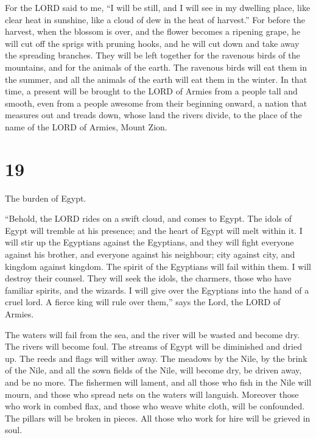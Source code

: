  For the LORD said to me, ``I will be still, and I will see
in my dwelling place, like clear heat in sunshine, like a cloud of dew
in the heat of harvest.''  For before the harvest, when the
blossom is over, and the flower becomes a ripening grape, he will cut
off the sprigs with pruning hooks, and he will cut down and take away
the spreading branches.  They will be left together for the
ravenous birds of the mountains, and for the animals of the earth. The
ravenous birds will eat them in the summer, and all the animals of the
earth will eat them in the winter.  In that time, a present
will be brought to the LORD of Armies from a people tall and smooth,
even from a people awesome from their beginning onward, a nation that
measures out and treads down, whose land the rivers divide, to the place
of the name of the LORD of Armies, Mount Zion.

\hypertarget{section-18}{%
\section{19}\label{section-18}}

 The burden of Egypt.

``Behold, the LORD rides on a swift cloud, and comes to Egypt. The idols
of Egypt will tremble at his presence; and the heart of Egypt will melt
within it.  I will stir up the Egyptians against the
Egyptians, and they will fight everyone against his brother, and
everyone against his neighbour; city against city, and kingdom against
kingdom.  The spirit of the Egyptians will fail within them.
I will destroy their counsel. They will seek the idols, the charmers,
those who have familiar spirits, and the wizards.  I will
give over the Egyptians into the hand of a cruel lord. A fierce king
will rule over them,'' says the Lord, the LORD of Armies.

 The waters will fail from the sea, and the river will be
wasted and become dry.  The rivers will become foul. The
streams of Egypt will be diminished and dried up. The reeds and flags
will wither away.  The meadows by the Nile, by the brink of
the Nile, and all the sown fields of the Nile, will become dry, be
driven away, and be no more.  The fishermen will lament, and
all those who fish in the Nile will mourn, and those who spread nets on
the waters will languish.  Moreover those who work in combed
flax, and those who weave white cloth, will be confounded. 
The pillars will be broken in pieces. All those who work for hire will
be grieved in soul.


